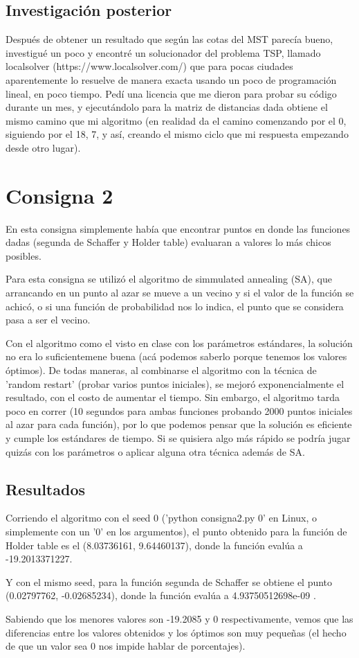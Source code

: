 \documentclass{article}
\begin{document}
\subsection{Investigación posterior}
Después de obtener un resultado que según las cotas del MST parecía bueno, investigué un poco y encontré un solucionador del problema TSP, llamado localsolver (https://www.localsolver.com/) que para pocas ciudades aparentemente lo resuelve de manera exacta usando un poco de programación lineal, en poco tiempo. Pedí una licencia que me dieron para probar su código durante un mes, y ejecutándolo para la matriz de distancias dada obtiene el mismo camino que mi algoritmo (en realidad da el camino comenzando por el 0, siguiendo por el 18, 7, y así, creando el mismo ciclo que mi respuesta empezando desde otro lugar).
\\

\section{Consigna 2}

En esta consigna simplemente había que encontrar puntos en donde las funciones dadas (segunda de Schaffer y Holder table) evaluaran a valores lo más chicos posibles.

Para esta consigna se utilizó el algoritmo de simmulated annealing (SA), que arrancando en un punto al azar se mueve a un vecino y si el valor de la función se achicó, o si una función de probabilidad nos lo indica, el punto que se considera pasa a ser el vecino.

Con el algoritmo como el visto en clase con los parámetros estándares, la solución no era lo suficientemene buena (acá podemos saberlo porque tenemos los valores óptimos).
De todas maneras, al combinarse el algoritmo con la técnica de 'random restart' (probar varios puntos iniciales), se mejoró exponencialmente el resultado, con el costo de aumentar el tiempo. Sin embargo, el algoritmo tarda poco en correr (10 segundos para ambas funciones probando 2000 puntos iniciales al azar para cada función), por lo que podemos pensar que la solución es eficiente y cumple los estándares de tiempo. Si se quisiera algo más rápido se podría jugar quizás con los parámetros o aplicar alguna otra técnica además de SA.

\subsection{Resultados}

Corriendo el algoritmo con el seed 0 ('python consigna2.py 0' en Linux, o simplemente con un '0' en los argumentos), el punto obtenido para la función de Holder table es el (8.03736161, 9.64460137), donde la función evalúa a -19.2013371227.

Y con el mismo seed, para la función segunda de Schaffer se obtiene el punto (0.02797762, -0.02685234), donde la función evalúa a 4.93750512698e-09 .

Sabiendo que los menores valores son -19.2085 y 0 respectivamente, vemos que las diferencias entre los valores obtenidos y los óptimos son muy pequeñas (el hecho de que un valor sea 0 nos impide hablar de porcentajes).
\end{document}
